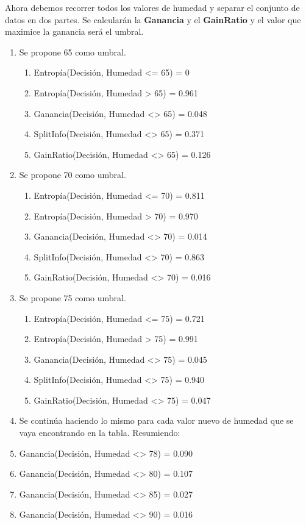 \begin{UClist}
	Ahora debemos recorrer todos los valores de humedad y separar el conjunto de datos en dos partes. Se calcularán la \textbf{Ganancia} y el \textbf{GainRatio} y el valor que maximice la ganancia será el umbral.\\

	\begin{enumerate}
		\item Se propone 65 como umbral.
		\begin{enumerate}
			\item Entropía(Decisión, Humedad <= 65) = 0
			\item Entropía(Decisión, Humedad > 65) = 0.961
			\item Ganancia(Decisión, Humedad <> 65) = 0.048
			\item SplitInfo(Decisión, Humedad <> 65) = 0.371
			\item GainRatio(Decisión, Humedad <> 65) = 0.126\\
		\end{enumerate}
		\item Se propone 70 como umbral.
		\begin{enumerate}
			\item Entropía(Decisión, Humedad <= 70) = 0.811
			\item Entropía(Decisión, Humedad > 70) = 0.970
			\item Ganancia(Decisión, Humedad <> 70) = 0.014
			\item SplitInfo(Decisión, Humedad <> 70) = 0.863
			\item GainRatio(Decisión, Humedad <> 70) = 0.016\\
		\end{enumerate}
		\item Se propone 75 como umbral.
		\begin{enumerate}
			\item Entropía(Decisión, Humedad <= 75) = 0.721
			\item Entropía(Decisión, Humedad > 75) = 0.991
			\item Ganancia(Decisión, Humedad <> 75) = 0.045
			\item SplitInfo(Decisión, Humedad <> 75) = 0.940
			\item GainRatio(Decisión, Humedad <> 75) = 0.047\\
		\end{enumerate}
		\item Se continúa haciendo lo mismo para cada valor nuevo de humedad que se vaya encontrando en la tabla. Resumiendo:
		\item Ganancia(Decisión, Humedad <> 78) = 0.090
		\item Ganancia(Decisión, Humedad <> 80) = 0.107
		\item Ganancia(Decisión, Humedad <> 85) = 0.027
		\item Ganancia(Decisión, Humedad <> 90) = 0.016
	\end{enumerate}


\end{UClist}
